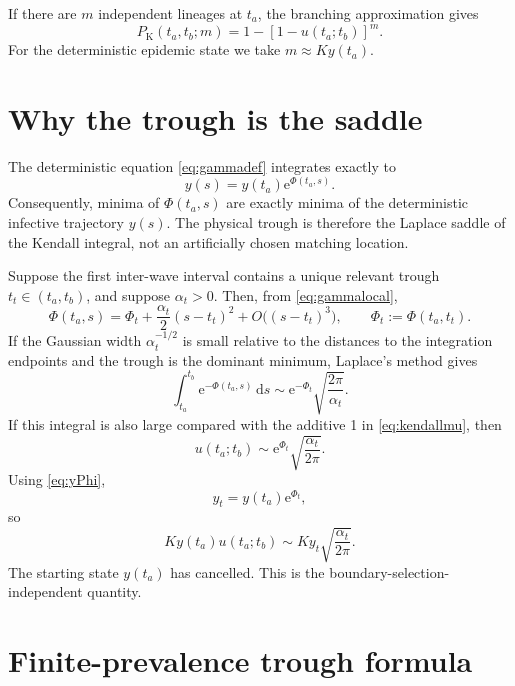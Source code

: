 \documentclass[11pt]{article}
\newcommand{\dd}{\,\mathrm d}
\newcommand{\e}{\mathrm e}
\newcommand{\PhiB}{\Phi}
\begin{document}
If there are \(m\) independent lineages at \(t_a\), the branching approximation gives
\begin{equation}
P_{\mathrm K}(t_a,t_b;m)
=1-[1-u(t_a;t_b)]^m.\label{eq:PKexact}
\end{equation}
For the deterministic epidemic state we take \(m\approx Ky(t_a)\).

\section{Why the trough is the saddle}

The deterministic equation \eqref{eq:gammadef} integrates exactly to
\begin{equation}
 y(s)=y(t_a)\e^{\PhiB(t_a,s)}.\label{eq:yPhi}
\end{equation}
Consequently, minima of \(\PhiB(t_a,s)\) are exactly minima of the deterministic infective trajectory \(y(s)\). The physical trough is therefore the Laplace saddle of the Kendall integral, not an artificially chosen matching location.

Suppose the first inter-wave interval contains a unique relevant trough \(t_t\in(t_a,t_b)\), and suppose \(\alpha_t>0\). Then, from \eqref{eq:gammalocal},
\begin{equation}
\PhiB(t_a,s)
=
\PhiB_t+\frac{\alpha_t}{2}(s-t_t)^2
+O\bigl((s-t_t)^3\bigr),
\qquad
\PhiB_t:=\PhiB(t_a,t_t).\label{eq:Philocal}
\end{equation}
If the Gaussian width \(\alpha_t^{-1/2}\) is small relative to the distances to the integration endpoints and the trough is the dominant minimum, Laplace's method gives
\begin{equation}
\int_{t_a}^{t_b}\e^{-\PhiB(t_a,s)}\dd s
\sim
\e^{-\PhiB_t}\sqrt{\frac{2\pi}{\alpha_t}}.\label{eq:laplaceint}
\end{equation}
If this integral is also large compared with the additive 1 in \eqref{eq:kendallmu}, then
\begin{equation}
 u(t_a;t_b)
 \sim
 \e^{\PhiB_t}\sqrt{\frac{\alpha_t}{2\pi}}.\label{eq:usingle}
\end{equation}
Using \eqref{eq:yPhi},
\[
 y_t=y(t_a)\e^{\PhiB_t},
\]
so
\begin{equation}
 Ky(t_a)u(t_a;t_b)
 \sim
 K y_t\sqrt{\frac{\alpha_t}{2\pi}}.\label{eq:Bcancel}
\end{equation}
The starting state \(y(t_a)\) has cancelled. This is the boundary-selection-independent quantity.

\section{Finite-prevalence trough formula}
\end{document}
